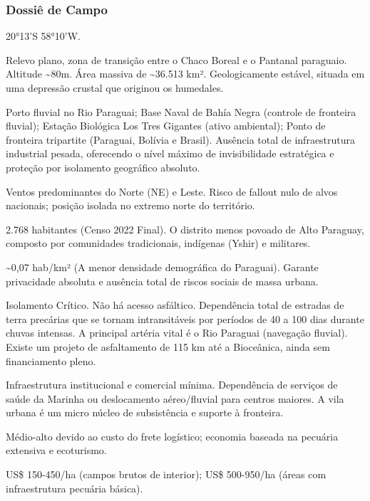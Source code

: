 \subsubsection{Dossiê de Campo}
\begin{description}[style=nextline,leftmargin=0.5cm,font=\bfseries]
\item[Coordenadas]  20°13'S 58°10'W.
\item[Topografia]  Relevo plano, zona de transição entre o Chaco Boreal e o Pantanal paraguaio. Altitude \textasciitilde 80m. Área massiva de \textasciitilde 36.513 km². Geologicamente estável, situada em uma depressão crustal que originou os humedales.
\item[Alvos Estratégicos]  Porto fluvial no Rio Paraguai; Base Naval de Bahía Negra (controle de fronteira fluvial); Estação Biológica Los Tres Gigantes (ativo ambiental); Ponto de fronteira tripartite (Paraguai, Bolívia e Brasil). Ausência total de infraestrutura industrial pesada, oferecendo o nível máximo de invisibilidade estratégica e proteção por isolamento geográfico absoluto.
\item[Fallout]  Ventos predominantes do Norte (NE) e Leste. Risco de fallout nulo de alvos nacionais; posição isolada no extremo norte do território.
\item[População]  2.768 habitantes (Censo 2022 Final). O distrito menos povoado de Alto Paraguay, composto por comunidades tradicionais, indígenas (Yshir) e militares.
\item[Densidade]  \textasciitilde 0,07 hab/\allowbreak km² (A menor densidade demográfica do Paraguai). Garante privacidade absoluta e ausência total de riscos sociais de massa urbana.
\item[Vias de Acesso]  Isolamento Crítico. Não há acesso asfáltico. Dependência total de estradas de terra precárias que se tornam intransitáveis por períodos de 40 a 100 dias durante chuvas intensas. A principal artéria vital é o Rio Paraguai (navegação fluvial). Existe um projeto de asfaltamento de 115 km até a Bioceânica, ainda sem financiamento pleno.
\item[Serviços]  Infraestrutura institucional e comercial mínima. Dependência de serviços de saúde da Marinha ou deslocamento aéreo/\allowbreak fluvial para centros maiores. A vila urbana é um micro núcleo de subsistência e suporte à fronteira.
\item[Custo de Vida]  Médio-alto devido ao custo do frete logístico; economia baseada na pecuária extensiva e ecoturismo.
\item[Preço da Terra]  US\$ 150-450/\allowbreak ha (campos brutos de interior); US\$ 500-950/\allowbreak ha (áreas com infraestrutura pecuária básica).

\end{description}
